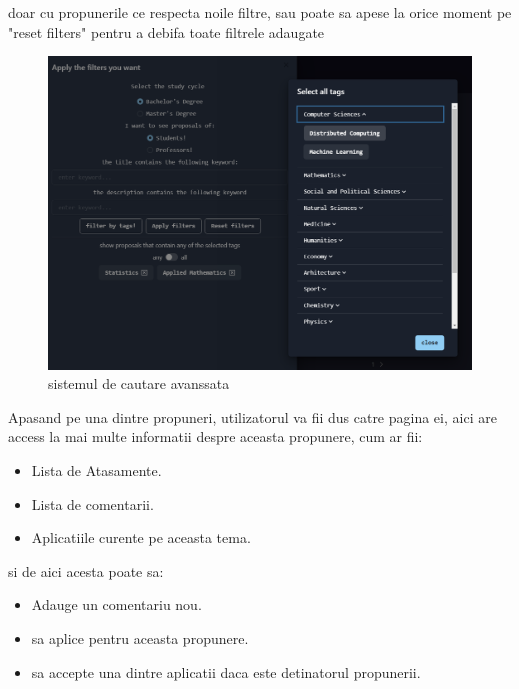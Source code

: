 \documentclass[12pt,a4paper,hidelinks]{report}
\theoremstyle{definition}
\theoremstyle{remark}
\begin{document}
    doar cu propunerile ce respecta noile filtre, sau poate sa apese la orice moment pe "reset filters" pentru a debifa toate filtrele adaugate
\begin{figure}[H]
    \centering
    \includegraphics[scale=0.5]{images/advancedSearch.PNG}
    \caption{sistemul de cautare avanssata}
\end{figure}
Apasand pe una dintre propuneri, utilizatorul va fii dus catre pagina ei, aici are access la mai multe informatii despre aceasta propunere, cum ar fii:
\begin{itemize}
    \item Lista de Atasamente.
    \item Lista de comentarii.
    \item Aplicatiile curente pe aceasta tema.
\end{itemize}
si de aici acesta poate sa:
\begin{itemize}
    \item Adauge un comentariu nou.
    \item sa aplice pentru aceasta propunere.
    \item sa accepte una dintre aplicatii daca este detinatorul propunerii.
\end{itemize}
\end{document}
